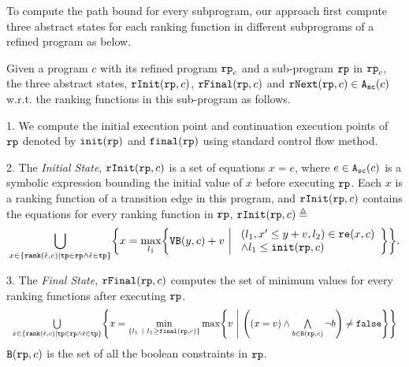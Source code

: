 To compute the path bound for every subprogram, our approach first compute three abstract states for each ranking function in different subprograms of a refined program as below.
\begin{defn}
 \label{def:alg-absstate}
 Given a program $c$ with its refined program $\mathtt{rp}_c$ and a sub-program $\mathtt{rp}$ in $\mathtt{rp}_c$, the three abstract states, $\mathtt{rInit}(\mathtt{rp}, c)$, $\mathtt{rFinal}(\mathtt{rp}, c)$ and $\mathtt{rNext}(\mathtt{rp}, c) \in {\ensuremath{\mathtt{A_{sc}}}}(c)$ w.r.t. the ranking functions in this sub-program as follows.
 
 1. We compute the initial execution point and continuation execution points of $\mathtt{rp}$ denoted by
 $\mathtt{init}(\mathtt{rp})$
 and 
 $\mathtt{final}(\mathtt{rp})$ using standard control flow method.
 
2. The \emph{Initial State}, 
 $\mathtt{rInit}(\mathtt{rp}, c)$ is a set of equations $x = e$, where $e \in {\ensuremath{\mathtt{A_{sc}}}}(c)$ is a
 symbolic expression bounding the initial value of $x$ before executing $\mathtt{rp}$.
 Each $x$ is a ranking function of a transition edge in this program, and $\mathtt{rInit}(\mathtt{rp}, c)$ contains the equations for every ranking function in $\mathtt{rp}$,
 $\mathtt{rInit}(\mathtt{rp}, c) \triangleq $
 {\small
 \[
 \bigcup_{x \in \left\{ \rank(\absevent, c) | \tpath \in \rprog \land \absevent \in \tpath \right\} }
 \left \{ 
 x = \max_{l_1}\left\{
 \varinvar(y, c) + v ~\middle\vert~ 
 \begin{array}{l} 
 (l_1, x' \leq y + v, l_2) \in \reset(x, c) 
 \\
 \land l_1 \leq \absinit(\rprog, c)
 \end{array}
 \right\}
 \right\}.
 \]
 }

 3. The \emph{Final State}, $\mathtt{rFinal}(\mathtt{rp}, c)$ computes the set of minimum values for every ranking functions
 after executing $\mathtt{rp}$.
 {\small
\[
 \begin{array}{l} 
 \bigcup\limits_{x \in \left\{ \rank(\absevent, c) | \tpath \in \rprog \land \absevent \in \tpath \right\} }
 \left \{ 
 x = \min\limits_{ \left\{ l_1 ~|~ l_1 \geq \absfinal(\rprog, c) \right\} }
 \max\left\{
 v ~\middle\vert~ 
 \left( (x = v) \land \bigwedge\limits_{b \in \kw{B}(\rprog, c)} \neg b \right) \neq \efalse
 \right\}
 \right\}
 \end{array}
 \]
 }
 $\mathtt{B}(\mathtt{rp}, c)$ is the set of all the boolean constraints in $\mathtt{rp}$.


\end{defn}
